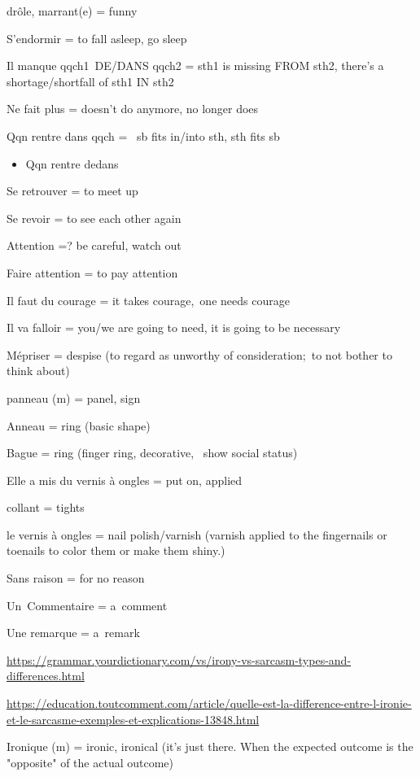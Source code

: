 drôle, marrant(e) = funny

S'endormir = to fall asleep, go sleep

Il manque qqch1~DE/DANS qqch2 = sth1 is missing FROM sth2, there's a
shortage/shortfall of sth1 IN sth2

Ne fait plus = doesn't do anymore, no longer does~

Qqn rentre {dans qqch =~ sb fits in/into sth, sth fits sb}

\begin{itemize}
\item
  {Qqn rentre dedans}
\end{itemize}

{Se retrouver = to meet up}

{Se revoir = to see each other again~}

{Attention =? be careful, watch out}

{Faire attention = to pay attention~}

{Il faut du courage = it takes courage,~one needs courage~}

{Il va falloir = you/we are going to need, it is going to be necessary~}

{Mépriser = despise (to regard as unworthy of consideration;~to not
bother to think about)}

{panneau (m) = panel, sign}

{Anneau = ring (basic shape)}

{Bague = ring (finger ring, decorative,~ show social status)}

{Elle a mis du vernis à ongles = put on, applied}

{collant = tights}

{le vernis à ongles = nail polish/varnish (}{varnish applied to the
fingernails or toenails to color them or make them shiny.}{)}

{Sans raison = for no reason~}

{Un~Commentaire = a~comment}

{Une remarque = a~remark~}

\url{https://grammar.yourdictionary.com/vs/irony-vs-sarcasm-types-and-differences.html}

\url{https://education.toutcomment.com/article/quelle-est-la-difference-entre-l-ironie-et-le-sarcasme-exemples-et-explications-13848.html}

{Ironique (m) = ironic, ironical (it's just there. When the expected
outcome is the "opposite" of the actual outcome)}

